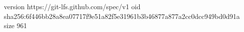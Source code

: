 version https://git-lfs.github.com/spec/v1
oid sha256:6f446bb28a8ea07717f9e51a82f5e31961b3b46877a877a2cc0dcc949bd0d91a
size 961
